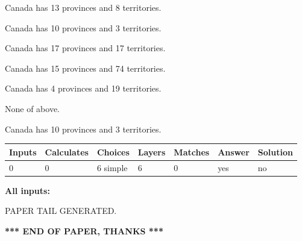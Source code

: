 \documentclass[12pt]{article}
\begin{document}
 
Canada has  13 provinces and  8 territories.
 
 
Canada has 10  provinces and 3 territories.
 
 
Canada has  17 provinces and  17 territories.
 
 
Canada has  15 provinces and  74 territories.
 
 
Canada has   4 provinces and  19 territories.
 
 
 None of above.
 
 
\noindent{}
 
 
Canada has 10  provinces and 3 territories.
 
 
\noindent{}
 
 
   
   
   
   
\noindent\begin{tabular}{|l|l|l|l|l|l|l|}
 \hline
Inputs & Calculates & Choices & Layers & Matches & Answer & Solution \\ \hline
 0  & 
 0  & 
 6
  simple  
  & 
 6  & 
 0  & 
  yes & 
  no 
  \\ \hline
 \end{tabular}
   
   
   
   
\noindent{}
   
   
   
   
\noindent\vspace{0.1in}\hspace{-0.08in} {\textbf{\Large{All inputs: }}}
   
   
   
   
   
   
 \vspace{0.2in}
 
   
   
\vspace{2.0in} PAPER TAIL GENERATED.
   
   
   
   
\vspace{1.0in} 
{\textbf{\large{ *** END OF PAPER, THANKS *** }}} 
   
\end{document}
